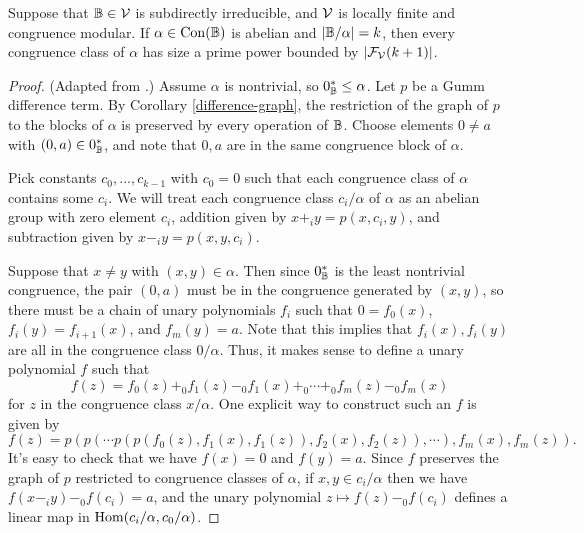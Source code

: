 \begin{appendices}
\begin{thm}\label{subdirect-ab-prime-power} Suppose that $\mathbb{B} \in \mathcal{V}$ is subdirectly irreducible, and $\mathcal{V}$ is locally finite and congruence modular. If $\alpha \in \operatorname{Con}(\mathbb{B})$ is abelian and $|\mathbb{B}/\alpha| = k$, then every congruence class of $\alpha$ has size a prime power bounded by $|\mathcal{F}_{\mathcal{V}}(k+1)|$.
\end{thm}
\begin{proof} (Adapted from \cite{commutator-uses}.) Assume $\alpha$ is nontrivial, so $0_{\mathbb{B}}^* \le \alpha$. Let $p$ be a Gumm difference term. By Corollary \ref{difference-graph}, the restriction of the graph of $p$ to the blocks of $\alpha$ is preserved by every operation of $\mathbb{B}$. Choose elements $0 \ne a$ with $(0,a) \in 0_{\mathbb{B}}^*$, and note that $0,a$ are in the same congruence block of $\alpha$.

Pick constants $c_0, ..., c_{k-1}$ with $c_0 = 0$ such that each congruence class of $\alpha$ contains some $c_i$. We will treat each congruence class $c_i/\alpha$ of $\alpha$ as an abelian group with zero element $c_i$, addition given by $x +_i y = p(x,c_i,y)$, and subtraction given by $x -_i y = p(x,y,c_i)$.

Suppose that $x \ne y$ with $(x,y) \in \alpha$. Then since $0_{\mathbb{B}}^*$ is the least nontrivial congruence, the pair $(0,a)$ must be in the congruence generated by $(x,y)$, so there must be a chain of unary polynomials $f_i$ such that $0 = f_0(x)$, $f_i(y) = f_{i+1}(x)$, and $f_m(y) = a$. Note that this implies that $f_i(x), f_i(y)$ are all in the congruence class $0/\alpha$. Thus, it makes sense to define a unary polynomial $f$ such that
\[
f(z) = f_0(z) +_0 f_1(z) -_0 f_1(x) +_0 \cdots +_0 f_m(z) -_0 f_m(x)
\]
for $z$ in the congruence class $x/\alpha$. One explicit way to construct such an $f$ is given by
\[
f(z) = p(p(\cdots p(p(f_0(z),f_1(x),f_1(z)), f_2(x), f_2(z)), \cdots), f_m(x), f_m(z)).
\]
It's easy to check that we have $f(x) = 0$ and $f(y) = a$. Since $f$ preserves the graph of $p$ restricted to congruence classes of $\alpha$, if $x,y \in c_i/\alpha$ then we have $f(x -_i y) -_0 f(c_i) = a$, and the unary polynomial $z \mapsto f(z) -_0 f(c_i)$ defines a linear map in $\operatorname{Hom}(c_i/\alpha, c_0/\alpha)$.


\end{proof}
\end{appendices}
